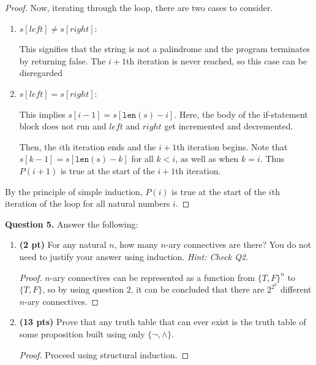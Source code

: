 \documentclass[11pt]{article}
\begin{document}
\begin{proof}
        Now, iterating through the loop, there are two cases to consider.
        \begin{enumerate}
           \item \(s[left] \neq s[right]\):
           
           This signifies that the string is not a palindrome and the program terminates by returning false. The \(i+1\)th iteration is never reached, so this case can be disregarded

           \item \(s[left] = s[right]\):
           
           This implies \(s[i - 1] = s[\texttt{len}(s) - i]\). Here, the body of the if-statement block does not run and \(left\) and \(right\) get incremented and decremented.

           Then, the \(i\)th iteration ends and the \(i+1\)th iteration begins. Note that \(s[k-1]=s[\texttt{len}(s) - k]\) for all \(k < i\), as well as when \(k=i\). Thus \(P(i+1)\) is true at the start of the \(i+1\)th iteration.
        \end{enumerate}
        By the principle of simple induction, \(P(i)\) is true at the start of the \(i\)th iteration of the loop for all natural numbers \(i\).

    \end{proof}
    \pagebreak
    \noindent\textbf{Question 5.} Answer the following:
    \begin{enumerate}
        \item \textbf{(2 pt)} For any natural $n$, how many $n$-ary connectives are there? You do not need to justify your answer using induction. \emph{Hint: Check Q2}.

        \begin{proof}
            \(n\)-ary connectives can be represented as a function from \(\{T, F\}^n\) to \(\{T, F\}\), so by using question 2, it can be concluded that there are \(2^{2^n}\) different \(n\)-ary connectives.

        \end{proof}
        \item \textbf{(13 pts)} Prove that any truth table that can ever exist is the truth table of some proposition built using only $\{\neg, \wedge\}$.
        
        \begin{proof}
            Proceed using structural induction.
        \end{proof}
    \end{enumerate}
\end{document}
